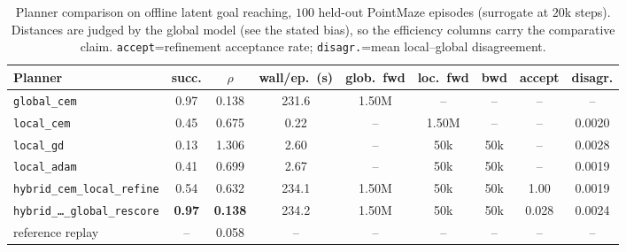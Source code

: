 \documentclass[11pt,a4paper]{article}
\begin{document}
\begin{table}[h]
\centering\scriptsize
\setlength{\tabcolsep}{4pt}
\begin{tabular}{@{}lcccccccc@{}}
\toprule
Planner & succ. & $\rho$ & wall/ep.\ (s) & glob.\ fwd & loc.\ fwd & bwd & accept & disagr. \\
\midrule
\texttt{global\_cem}                     & 0.97 & 0.138 & 231.6 & 1.50M & --    & --    & --    & --     \\
\texttt{local\_cem}                      & 0.45 & 0.675 & 0.22  & --    & 1.50M & --    & --    & 0.0020 \\
\texttt{local\_gd}                       & 0.13 & 1.306 & 2.60  & --    & 50k   & 50k   & --    & 0.0028 \\
\texttt{local\_adam}                     & 0.41 & 0.699 & 2.67  & --    & 50k   & 50k   & --    & 0.0019 \\
\texttt{hybrid\_cem\_local\_refine}      & 0.54 & 0.632 & 234.1 & 1.50M & 50k   & 50k   & 1.00  & 0.0019 \\
\texttt{hybrid\_\dots\_global\_rescore}  & \textbf{0.97} & \textbf{0.138} & 234.2 & 1.50M & 50k & 50k & 0.028 & 0.0024 \\
\midrule
reference replay                         & --   & 0.058 & --    & --    & --    & --    & --    & --     \\
\bottomrule
\end{tabular}
\caption{Planner comparison on offline latent goal reaching, $100$ held-out
PointMaze episodes (surrogate at $20$k steps). Distances are judged by the
global model (see the stated bias), so the efficiency columns carry the
comparative claim. \texttt{accept}=refinement acceptance rate;
\texttt{disagr.}=mean local--global disagreement.}
\label{tab:trackiii-planners}
\end{table}
\end{document}
